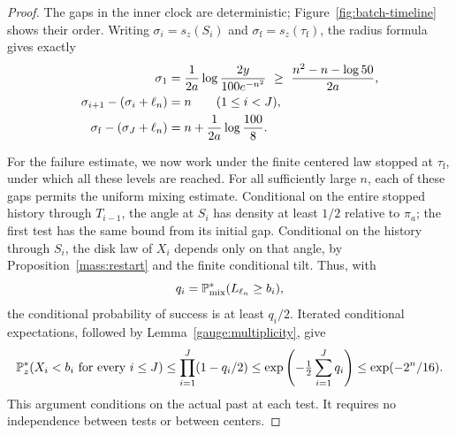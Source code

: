 \begin{proof}
The gaps in the inner clock are deterministic;
Figure~\ref{fig:batch-timeline} shows their order.
Writing \(\sigma_i=s_z(S_i)\) and
\(\sigma_{\mathrm f}=s_z(\tau_{\mathrm f})\), the radius formula
gives exactly
\begin{align}
 \sigma_1
   &=\frac{1}{2a}\log\frac{2y}{100e^{-n^2}}
     \ \ge\ \frac{n^2-n-\log50}{2a}, \notag\\
 \sigma_{i+1}-(\sigma_i+\ell_n)&=n
       \qquad(1\le i<J), \label{hd:test-gaps}\\
 \sigma_{\mathrm f}-(\sigma_J+\ell_n)
   &=n+\frac{1}{2a}\log\frac{100}{8}. \notag
\end{align}

For the failure estimate, we now work under the finite centered law
stopped at \(\tau_{\mathrm f}\), under which all these levels are reached.
For all sufficiently large \(n\), each of these gaps permits
the uniform mixing estimate. Conditional on the entire stopped
history through \(T_{i-1}\), the angle at \(S_i\) has density at
least \(1/2\) relative to \(\pi_a\); the first test has the same
bound from its initial gap.
Conditional on the history through \(S_i\), the disk law of
\(X_i\) depends only on that angle, by
Proposition~\ref{mass:restart} and the finite conditional tilt.
Thus, with
\[
 q_i=\mathbb P^*_{\mathrm{mix}}(L_{\ell_n}\ge b_i),
\]
the conditional probability of success is at least \(q_i/2\).
Iterated conditional expectations, followed by
Lemma~\ref{gauge:multiplicity}, give
\begin{equation}
 \mathbb P_z^*(X_i<b_i\text{ for every }i\le J)
 \le\prod_{i=1}^J(1-q_i/2)
 \le \exp\left(-\tfrac12\sum_{i=1}^Jq_i\right)
 \le \exp(-2^n/16).
 \label{hd:test-failure}
\end{equation}
This argument conditions on the actual past at each test.
It requires no independence between tests or between centers.


\end{proof}

